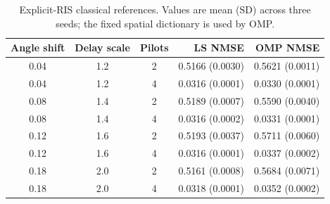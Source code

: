 \begin{table}[t]
\centering
\caption{Explicit-RIS classical references. Values are mean (SD) across three seeds; the fixed spatial dictionary is used by OMP.}
\label{tab:r032omp}
\begin{tabular}{cccrr}
\toprule
Angle shift & Delay scale & Pilots & LS NMSE & OMP NMSE\\
\midrule
0.04 & 1.2 & 2 & 0.5166 (0.0030) & 0.5621 (0.0011)\\
0.04 & 1.2 & 4 & 0.0316 (0.0001) & 0.0330 (0.0001)\\
0.08 & 1.4 & 2 & 0.5189 (0.0007) & 0.5590 (0.0040)\\
0.08 & 1.4 & 4 & 0.0316 (0.0002) & 0.0331 (0.0001)\\
0.12 & 1.6 & 2 & 0.5193 (0.0037) & 0.5711 (0.0060)\\
0.12 & 1.6 & 4 & 0.0316 (0.0001) & 0.0337 (0.0002)\\
0.18 & 2.0 & 2 & 0.5161 (0.0008) & 0.5684 (0.0071)\\
0.18 & 2.0 & 4 & 0.0318 (0.0001) & 0.0352 (0.0002)\\
\bottomrule
\end{tabular}
\end{table}
